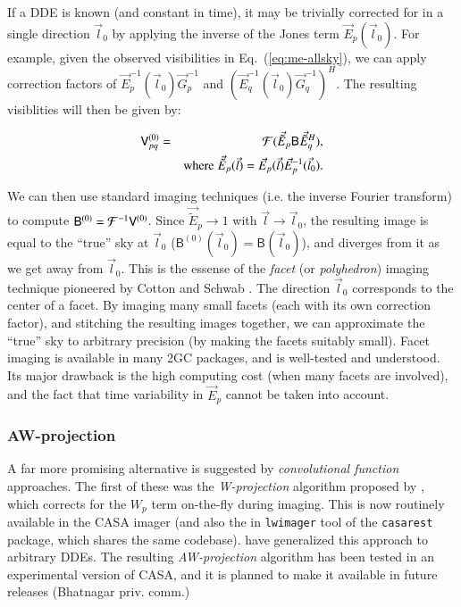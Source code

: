 \documentclass[referee]{aa}
\newcommand{\herm}{H}
\newcommand{\jones}[2]{\vec {#1}_{#2}}
\newcommand{\jonesinv}[2]{\vec {#1}^{-1}_{#2}}
\newcommand{\jonesT}[2]{\vec {#1}^{\herm}_{#2}}
\newcommand{\coh}[2]{\mathsf{{#1}}_{{#2}}}
\begin{document}
If a DDE is known (and constant in time), it may be trivially corrected for in a single direction $\vec l_0$ by applying the inverse of the Jones term $\jones{E}{p}(\vec l_0)$. For example, given the observed visibilities in Eq.~(\ref{eq:me-allsky}), we can apply correction factors of $\jonesinv{E}{p}(\vec l_0)\jonesinv{G}{p}$ and $(\jonesinv{E}{q}(\vec l_0)\jonesinv{G}{q})^{\herm}$. The resulting visiblities will then be given by:

\begin{eqnarray*}
\coh{V}{pq}^{(0)} & = & {\cal F}( \jones{\tilde E}{p} \coh{B}{} \jonesT{\tilde E}{q} ), \\
 & & \mathrm{where} \; \jones{\tilde E}{p}(\vec l) = \jones{E}{p}(\vec l)\jonesinv{E}{p}(\vec l_0).
\end{eqnarray*}

We can then use standard imaging techniques (i.e. the inverse Fourier transform) to compute $\coh{B}{}^{(0)} = {\cal F}^{-1}\coh{V}{}^{(0)}$. Since $\jones{\tilde E}{p}\to1$ with $\vec l \to \vec l_0$, the resulting image is equal to the ``true'' sky at $\vec l_0$  ($\coh{B}{}^{(0)}(\vec l_0) =  \coh{B}{}(\vec l_0)$), and diverges from it as we get away from $\vec l_0$. This is the essense of the \emph{facet} (or \emph{polyhedron}) imaging technique pioneered by Cotton and Schwab \citep[for an overview, see][]{faceting}. The direction $\vec l_0$ corresponds to the center of a facet. By imaging many small facets (each with its own correction factor), and stitching the resulting images together, we can approximate the ``true'' sky to arbitrary precision (by making the facets suitably small). Facet imaging is available in many 2GC packages, and is well-tested and understood. Its major drawback is the high computing cost (when many facets are involved), and the fact that time variability in $\jones{E}{p}$ cannot be taken into account. 

\subsubsection{AW-projection}

A far more promising alternative is suggested by \emph{convolutional function} approaches. The first of these was the \emph{W-projection} algorithm proposed by \citet{Cornwell:wproj}, which corrects for the $W_p$ term on-the-fly during imaging. This is now routinely available in the CASA imager (and also the in {\tt lwimager} tool of the {\tt casarest} package, which shares the same codebase). \citet{SB:imageplane} have generalized this approach to arbitrary DDEs. The resulting \emph{AW-projection} algorithm has been tested in an experimental version of CASA, and it is planned to make it available in future releases (Bhatnagar priv. comm.)
\end{document}
